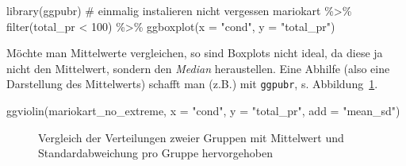 \documentclass[
  letterpaper,
]{scrbook}
\newenvironment{Shaded}{\begin{snugshade}}{\end{snugshade}}
\newcommand{\AttributeTok}[1]{\textcolor[rgb]{0.40,0.45,0.13}{#1}}
\newcommand{\CommentTok}[1]{\textcolor[rgb]{0.37,0.37,0.37}{#1}}
\newcommand{\DecValTok}[1]{\textcolor[rgb]{0.68,0.00,0.00}{#1}}
\newcommand{\FunctionTok}[1]{\textcolor[rgb]{0.28,0.35,0.67}{#1}}
\newcommand{\NormalTok}[1]{\textcolor[rgb]{0.00,0.23,0.31}{#1}}
\newcommand{\SpecialCharTok}[1]{\textcolor[rgb]{0.37,0.37,0.37}{#1}}
\newcommand{\StringTok}[1]{\textcolor[rgb]{0.13,0.47,0.30}{#1}}
\theoremstyle{definition}
\theoremstyle{definition}
\theoremstyle{definition}
\theoremstyle{remark}
\begin{document}
\begin{Shaded}
\begin{Highlighting}[]
\FunctionTok{library}\NormalTok{(ggpubr)  }\CommentTok{\# einmalig instalieren nicht vergessen}
\NormalTok{mariokart }\SpecialCharTok{\%\textgreater{}\%} 
  \FunctionTok{filter}\NormalTok{(total\_pr }\SpecialCharTok{\textless{}} \DecValTok{100}\NormalTok{) }\SpecialCharTok{\%\textgreater{}\%} 
  \FunctionTok{ggboxplot}\NormalTok{(}\AttributeTok{x =} \StringTok{"cond"}\NormalTok{, }\AttributeTok{y =} \StringTok{"total\_pr"}\NormalTok{)}
\end{Highlighting}
\end{Shaded}

Möchte man Mittelwerte vergleichen, so sind Boxplots nicht ideal, da
diese ja nicht den Mittelwert, sondern den \emph{Median} heraustellen.
Eine Abhilfe (also eine Darstellung des Mittelwerts) schafft man (z.B.)
mit \texttt{ggpubr}, s. Abbildung~\ref{fig-comp-means-ggpubr}.

\begin{Shaded}
\begin{Highlighting}[]
\FunctionTok{ggviolin}\NormalTok{(mariokart\_no\_extreme, }
         \AttributeTok{x =} \StringTok{"cond"}\NormalTok{, }
         \AttributeTok{y =} \StringTok{"total\_pr"}\NormalTok{,}
         \AttributeTok{add =} \StringTok{"mean\_sd"}\NormalTok{) }
\end{Highlighting}
\end{Shaded}

\begin{figure}[H]


\caption{\label{fig-comp-means-ggpubr}Vergleich der Verteilungen zweier
Gruppen mit Mittelwert und Standardabweichung pro Gruppe hervorgehoben}

\end{figure}%
\end{document}
